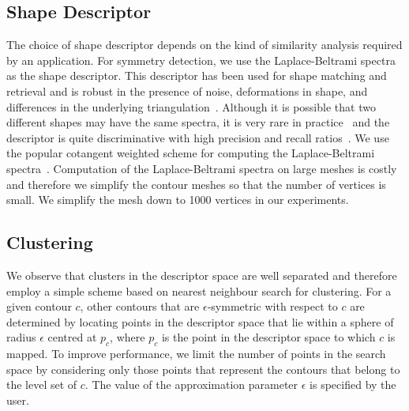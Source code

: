 \documentclass[review,journal]{vgtc}         %
\begin{document}
\subsection{Shape Descriptor}
The choice of shape descriptor depends on the kind of similarity
analysis required by an application. For symmetry detection, we use the 
Laplace-Beltrami spectra as the shape descriptor. This descriptor has been used for 
shape matching and retrieval and is robust in the 
presence of noise, deformations in shape, and differences in the underlying 
triangulation~\cite{reuter2006laplace,niethammer2007global,reuter2009laplace}. 
Although it is possible that two different shapes may have the same spectra,
it is very rare in practice~\cite{reuter2006laplace} and the descriptor is 
quite discriminative with high precision and recall ratios~\cite{lian2013}. 
We use the popular cotangent weighted scheme for computing the 
Laplace-Beltrami spectra~\cite{PinkallP93}. Computation of the Laplace-Beltrami spectra 
on large meshes is costly and therefore we simplify the contour meshes 
so that the number of vertices is small. We simplify the mesh down to 1000 
vertices in our experiments. 
\subsection{Clustering}
We observe that clusters in the descriptor space are well separated and therefore
employ a simple scheme based on nearest neighbour search for clustering.
For a given contour $c$, other contours that are $\epsilon$-symmetric
with respect to $c$ are determined by locating points in the descriptor
space that lie within a sphere of radius $\epsilon$ centred at $p_c$,
where $p_c$ is the point in the descriptor space to which $c$ is mapped.
To improve performance, we limit the number of points in the search space 
by considering only those points that represent the contours that belong to
the level set of $c$. The value of the approximation parameter $\epsilon$
is specified by the user.
\end{document}
